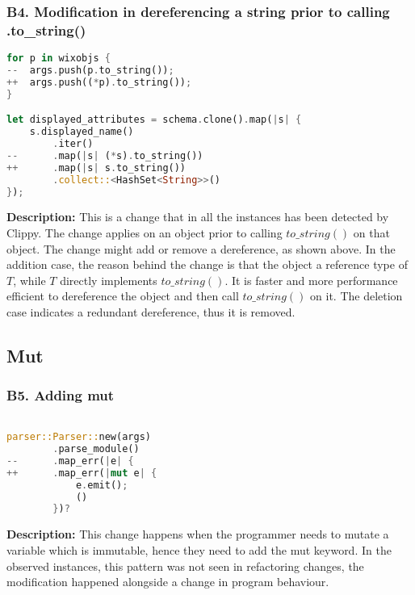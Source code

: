 \subsubsection{B4. Modification in dereferencing a string prior to calling .to\_string()}

\begin{lstlisting}[language=Rust, style=colouredRust, label={l3}]
for p in wixobjs {
--  args.push(p.to_string());
++  args.push((*p).to_string());
}

let displayed_attributes = schema.clone().map(|s| {
    s.displayed_name()
        .iter()
--      .map(|s| (*s).to_string())
++      .map(|s| s.to_string())
        .collect::<HashSet<String>>()
});
\end{lstlisting}

\noindent \textbf{Description:} This is a change that in all the instances has been detected by Clippy. The change applies on an object prior to calling $to\_string()$ on that object. The change might add or remove a dereference, as shown above. In the addition case, the reason behind the change is that the object a reference type of $T$, while $T$ directly implements $to\_string()$. It is faster and more performance efficient to dereference the object and then call $to\_string()$ on it. The deletion case indicates a redundant dereference, thus it is removed.


\subsection{Mut}
\subsubsection{B5. Adding mut}

\begin{lstlisting}[language=Rust, style=colouredRust, label={l3}]

parser::Parser::new(args)
        .parse_module()
--      .map_err(|e| {
++      .map_err(|mut e| {
            e.emit();
            ()
        })?

\end{lstlisting}

\noindent \textbf{Description:} This change happens when the programmer needs to mutate a variable which is immutable, hence they need to add the mut keyword. In the observed instances, this pattern was not seen in refactoring changes, the modification happened alongside a change in program behaviour.

